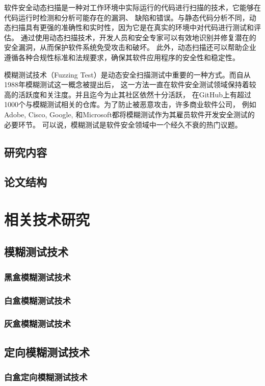 \documentclass[bachelor]{njupthesis}
\begin{document}
软件安全动态扫描是一种对工作环境中实际运行的代码进行扫描的技术，它能够在代码运行时检测和分析可能存在的漏洞、
缺陷和错误。与静态代码分析不同，动态扫描具有更强的准确性和实时性，因为它是在真实的环境中对代码进行测试和评估。
通过使用动态扫描技术，开发人员和安全专家可以有效地识别并修复潜在的安全漏洞，从而保护软件系统免受攻击和破坏。
此外，动态扫描还可以帮助企业遵循各种合规性标准和法规要求，确保其软件应用程序的安全性和稳定性。

模糊测试技术（Fuzzing Test）是动态安全扫描测试中重要的一种方式。而自从1988年模糊测试这一概念被提出后，
这一方法一直在软件安全测试领域保持着较高的活跃度和关注度。并且迄今为止其社区依然十分活跃，
在GitHub上有超过1000个与模糊测试相关的仓库\cite{manes2019art}。为了防止被恶意攻击，许多商业软件公司，
例如Adobe, Cisco, Google, 和Microsoft都将模糊测试作为其雇员软件开发安全测试的必要环节。
可以说，模糊测试是软件安全领域中一个经久不衰的热门议题。


\section{研究内容}
\section{论文结构}

\chapter{相关技术研究}
\section{模糊测试技术}
\subsection{黑盒模糊测试技术}
\subsection{白盒模糊测试技术}
\subsection{灰盒模糊测试技术}
\section{定向模糊测试技术}
\subsection{白盒定向模糊测试技术}
\end{document}
